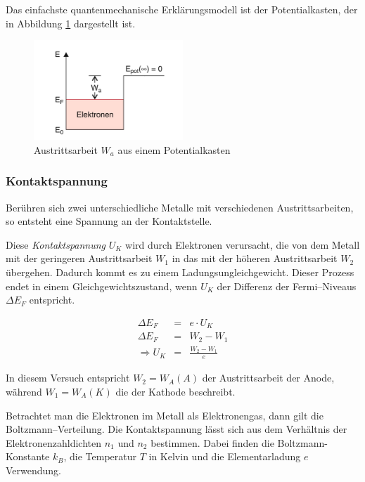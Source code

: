 \documentclass[12pt,a4paper]{scrartcl}
\numberwithin{equation}{section} %
\begin{document}
\noindent
Das einfachste quantenmechanische Erklärungsmodell ist der Potentialkasten, der in Abbildung \ref{fig:Austrittsarbeit} dargestellt ist.

\begin{figure}[h!]
	\centering
	\includegraphics[width=0.5\textwidth]{../media/B1.4/Austrittsarbeit_Potentialkasten.jpg}
	\caption{Austrittsarbeit $W_a$ aus einem Potentialkasten \cite{Demtröder}}
	\label{fig:Austrittsarbeit}
\end{figure}

\subsubsection{Kontaktspannung}
Berühren sich zwei unterschiedliche Metalle mit verschiedenen Austrittsarbeiten, so entsteht eine Spannung an der Kontaktstelle.

Diese \emph{Kontaktspannung} $U_K$ wird durch Elektronen verursacht, die von dem Metall mit der geringeren Austrittsarbeit $W_1$ in das mit der höheren Austrittsarbeit $W_2$ übergehen. Dadurch kommt es zu einem Ladungsungleichgewicht. Dieser Prozess endet in einem Gleichgewichtszustand, wenn $U_K$ der Differenz der Fermi--Niveaus $\Delta E_F$ entspricht.

\begin{eqnarray}
	\Delta E_F &=& e \cdot U_K \\
	\Delta E_F &=& W_2 - W_1 \\
	\Rightarrow U_K &=& \frac{W_2 -W_1}{e}
\end{eqnarray}

\noindent
In diesem Versuch entspricht $W_2=W_A(A)$ der Austrittsarbeit der Anode, während $W_1=W_A(K)$ die der Kathode beschreibt.

Betrachtet man die Elektronen im Metall als Elektronengas, dann gilt die Boltzmann--Verteilung. Die Kontaktspannung lässt sich aus dem Verhältnis der Elektronenzahldichten $n_1$ und $n_2$ bestimmen. Dabei finden die Boltzmann-Konstante $k_B$, die Temperatur $T$ in Kelvin und die Elementarladung $e$ Verwendung.
\end{document}
